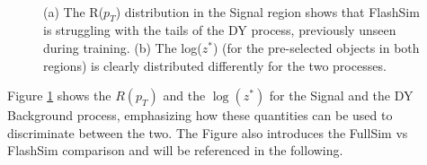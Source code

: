 \begin{figure}
    \myfloatalign
    \\
    \caption[Angular distributions]{ (a) The R($p_T$) distribution in the Signal region shows that FlashSim is struggling with the tails of the DY process, previously unseen during training. (b) The log($z^*$) (for the pre-selected objects in both regions) is clearly distributed differently for the two processes.}\label{fig:angulardist}
\end{figure}

Figure \ref{fig:angulardist} shows the $R(p_T)$ and the $\log(z^*)$ for the Signal and the DY Background process, emphasizing how these quantities can be used to discriminate between the two. The Figure also introduces the FullSim vs FlashSim comparison and will be referenced in the following.

